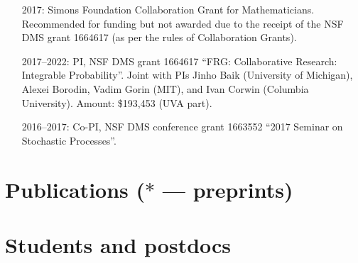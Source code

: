 \documentclass[letterpaper,11pt]{article}
\begin{document}
\begin{itemize}
	\item
	      [2017:] Simons Foundation Collaboration Grant for
	      Mathematicians. Recommended for funding but not awarded due to
	      the receipt of the NSF DMS grant 1664617 (as per the rules of Collaboration
	      Grants).
	\item
			[2017--2022:] PI, NSF DMS grant 1664617
	      ``FRG: Collaborative Research: Integrable Probability''.
	      Joint with PIs Jinho Baik (University of Michigan), Alexei
	      Borodin, Vadim Gorin (MIT), and Ivan Corwin (Columbia University). Amount:
	      \$193,453 (UVA part).
	\item
		[2016--2017:] Co-PI,
	      NSF DMS conference grant 1663552 ``2017 Seminar on Stochastic
				Processes''.
\end{itemize}

\section*{Publications ($*$ --- preprints)}



\section*{Students and postdocs}
\end{document}
